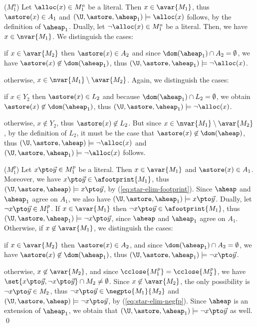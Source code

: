 {  ($M_1^a$) Let $\alloc(x) \in M_1^a$ be a literal. Then $x \in
  \avar{M_1}$, thus $\astore(x) \in A_1$ and $(\U,\astore,\aheap_1)
  \models \alloc(x)$ follows, by the definition of $\aheap_1$. Dually,
  let $\neg\alloc(x) \in M_1^a$ be a literal. Then, we have $x \in
  \nvar{M_1}$. We distinguish the cases: \begin{compactitem}
  \item if $x \in \avar{M_2}$ then $\astore(x) \in A_2$ and since
    $\dom(\aheap_1) \cap A_2 = \emptyset$, we have $\astore(x) \not\in
    \dom(\aheap_1)$, thus $(\U,\astore,\aheap_1) \models
    \neg\alloc(x)$.
  \item otherwise, $x \in \nvar{M_1} \setminus
    \avar{M_2}$. Again, we distinguish the cases: \begin{compactitem}
    \item if $x \in Y_2$ then $\astore(x) \in L_2$ and because
      $\dom(\aheap_1) \cap L_2 = \emptyset$, we obtain $\astore(x)
      \not\in \dom(\aheap_1)$, thus $(\U,\astore,\aheap_1) \models
      \neg\alloc(x)$.
    \item otherwise, $x \not\in Y_2$, thus $\astore(x) \not\in
      L_2$. But since $x \in \nvar{M_1} \setminus \avar{M_2}$,
      by the definition of $L_2$, it must be the case that $\astore(x)
      \not\in \dom(\aheap)$, thus $(\U,\astore,\aheap) \models
      \neg\alloc(x)$ and $(\U,\astore,\aheap_1) \models \neg\alloc(x)$
      follows.
    \end{compactitem}
  \end{compactitem} 

  ($M_1^p$) Let $x \pto \vec{y} \in M_1^p$ be a literal. Then $x \in
  \avar{M_1}$ and $\astore(x) \in A_1$. Moreover, we have $x \pto
  \vec{y} \in \afootprint{M_1}$, thus $(\U,\astore,\aheap) \models x
  \pto \vec{y}$, by (\ref{eq:star-elim-footprint}). Since $\aheap$ and
  $\aheap_1$ agree on $A_1$, we also have $(\U,\astore,\aheap_1)
  \models x \pto \vec{y}$. Dually, let $\neg x \pto \vec{y} \in
  M_1^p$. If $x \in \avar{M_1}$ then $\neg x \pto \vec{y} \in
  \afootprint{M_1}$, thus $(\U,\astore,\aheap_1) \models \neg x \pto
  \vec{y}$, since $\aheap$ and $\aheap_1$ agree on $A_1$. Otherwise,
  if $x \not\in \avar{M_1}$, we distinguish the
  cases: \begin{compactitem}
  \item if $x \in \avar{M_2}$ then $\astore(x) \in A_2$, and since
    $\dom(\aheap_1) \cap A_2 = \emptyset$, we have $\astore(x) \not\in
    \dom(\aheap_1)$, thus $(\U,\astore,\aheap_1) \models \neg x \pto
    \vec{y}$. 
  \item otherwise, $x \not\in \avar{M_2}$, and since $\cclose{M_1^p} =
    \cclose{M_2^p}$, we have $\set{x \pto \vec{y}, \neg x \pto
      \vec{y}} \cap M_2 \neq \emptyset$. Since $x \not\in
    \avar{M_2}$, the only possibility is $\neg x \pto \vec{y} \in M_2$,
    thus $\neg x \pto \vec{y} \in \negpto{M_1}{M_2}$ and
    $(\U,\astore,\aheap) \models \neg x \pto \vec{y}$, by
    (\ref{eq:star-elim-negfp}). Since $\aheap$ is an extension of
    $\aheap_1$, we obtain that $(\U,\astore,\aheap_1) \models \neg x
    \pto \vec{y}$ as well. \qed
  \end{compactitem}}

